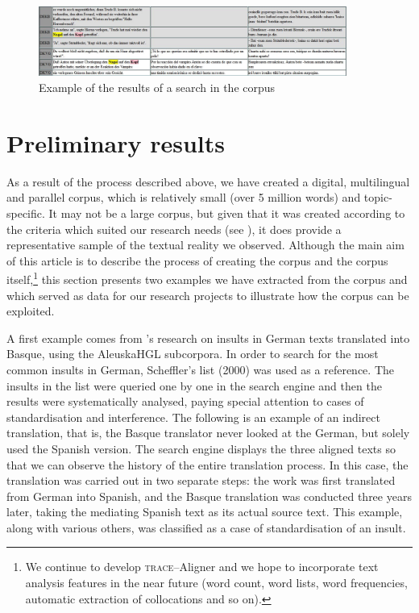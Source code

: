 \documentclass[output=paper]{LSP/langsci}
\begin{document}
\begin{figure}
\includegraphics[width=0.9\textwidth]{./figures/6-7.jpg} 
\caption{Example of the results of a search in the corpus} \label{fig:3:7}
\end{figure}

\section{Preliminary results}
As a result of the process described above, we have created a digital, multilingual and parallel corpus, which is relatively small (over 5 million words) and topic-specific. It may not be a large corpus, but given that it was created according to the criteria which suited our research needs (see ), it does provide a representative sample of the textual reality we observed. Although the main aim of this article is to describe the process of creating the corpus and the corpus itself,\footnote{We continue to develop \textsc{trace}--Aligner and we hope to incorporate text analysis features in the near future (word count, word lists, word frequencies, automatic extraction of collocations and so on).} this section presents two examples we have extracted from the corpus and which served as data for our research projects to illustrate how the corpus can be exploited.

A first example comes from \citeauthor{Zubillaga2013}'s \citeyear{Zubillaga2013} research on insults in German texts translated into Basque, using the AleuskaHGL subcorpora. In order to search for the most common insults in German, Scheffler's list (2000) was used as a reference. The insults in the list were queried one by one in the search engine and then the results were systematically analysed, paying special attention to cases of standardisation and interference. The following is an example of an indirect translation, that is, the Basque translator never looked at the German, but solely used the Spanish version. The search engine displays the three aligned texts so that we can observe the history of the entire translation process. In this case, the translation was carried out in two separate steps: the work was first translated from German into Spanish, and the Basque translation was conducted three years later, taking the mediating Spanish text as its actual source text. This example, along with various others, was classified as a case of standardisation of an insult.
\end{document}
